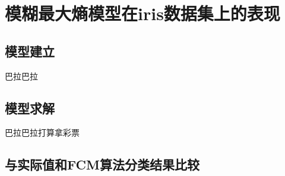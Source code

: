 \chapter{模糊最大熵模型在iris数据集上的表现}
\section{模型建立}
巴拉巴拉
\section{模型求解}
巴拉巴拉打算拿彩票
\section{与实际值和FCM算法分类结果比较}